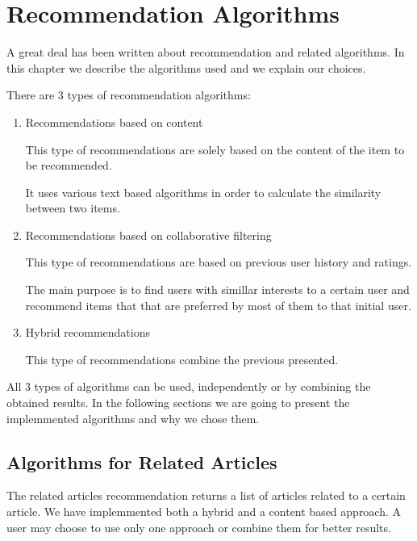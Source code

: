 \chapter{Recommendation Algorithms}
\label{chapter:recommendation-system-algorithms}
A great deal has been written about recommendation and related algorithms. In this chapter we describe the algorithms used and we explain our choices.

There are 3 types of recommendation algorithms: 
\begin{enumerate}
	\item Recommendations based on content
		 
		This type of recommendations are solely based on the content of the item to be recommended.
		
		It uses various text based algorithms in order to calculate the similarity between two items.

	\item Recommendations based on collaborative filtering 
		
		This type of recommendations are based on previous user history and ratings.
		 
		The main purpose is to find users with simillar interests to a certain user and recommend items that that are preferred by most of them to that initial user.
	
	\item Hybrid recommendations

		This type of recommendations combine the previous presented.

\end{enumerate}
All 3 types of algorithms can be used, independently or by combining the obtained results.
In the following sections we are going to present the implemmented algorithms and why we chose them.


\section{Algorithms for Related Articles}
\label{sec:algorithms-for-related-articles}
The related articles recommendation returns a list of articles related to a certain article.
We have implemmented both a hybrid and a content based approach.
A user may choose to use only one approach or combine them for better results.

